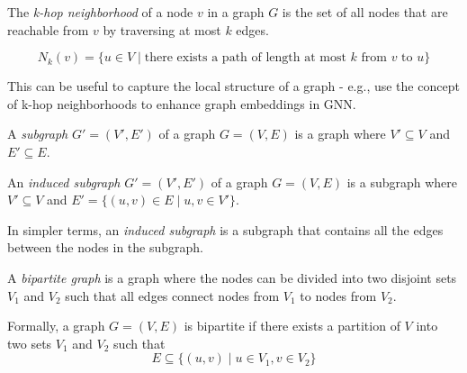 \begin{definition}
    The \textit{k-hop neighborhood} of a node $v$ in a graph $G$ is the set of all nodes that are reachable from $v$ by traversing at most $k$ edges.

    $$
    N_k(v) = \{ u \in V \mid \text{there exists a path of length at most $k$ from $v$ to $u$} \}
    $$

    This can be useful to capture the local structure of a graph 
    - e.g., \cite{nikolentzos2019khop} use the concept of k-hop neighborhoods to enhance graph embeddings in \ac{GNN}.
\end{definition}

\begin{definition}[Subgraph]
    A \textit{subgraph} $G' = (V', E')$ of a graph $G = (V, E)$ is a graph where $V' \subseteq V$ and $E' \subseteq E$.
\end{definition}

\begin{definition}
    An \textit{induced subgraph} $G' = (V', E')$ of a graph $G = (V, E)$ is a subgraph where $V' \subseteq V$ and $E' = \{ (u, v) \in E \mid u, v \in V' \}$.

    In simpler terms, an \textit{induced subgraph} is a subgraph that contains all the edges between the nodes in the subgraph.
\end{definition}

\begin{definition}
    A \textit{bipartite graph} is a graph where the nodes can be divided into two disjoint sets $V_1$ and $V_2$ such that all edges connect nodes from $V_1$ to nodes from $V_2$.
    
    Formally, a graph $G = (V, E)$ is bipartite if there exists a partition of $V$ into two sets $V_1$ and $V_2$ such that
    $$E \subseteq \{ (u, v) \mid u \in V_1, v \in V_2 \}$$
\end{definition}

